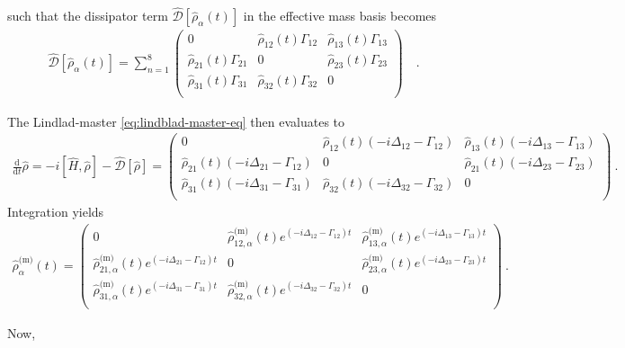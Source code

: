 %
such that the dissipator term $\hat{\mathcal{D}}[\hat{\rho}_\alpha(t)]$ in the effective mass basis becomes
%
    \begin{align} \label{eq:decoherence_operator_eval_with_couplings}
        \hat{\mathcal{D}}[\hat{\rho}_\alpha(t)] 
        =
        \sum_{n=1}^8
        \begin{pmatrix}
            0 & \hat{\rho}_{12}(t) \Gamma_{12} & \hat{\rho}_{13}(t)\Gamma_{13} \\
            \hat{\rho}_{21}(t)\Gamma_{21} & 0 & \hat{\rho}_{23}(t)\Gamma_{23} \\
            \hat{\rho}_{31}(t)\Gamma_{31} & \hat{\rho}_{32}(t)\Gamma_{32} & 0 \\
        \end{pmatrix}
        \quad \text{.}
    \end{align}
%

The Lindlad-master \cref{eq:lindblad-master-eq} then evaluates to
%
\begin{align} \label{eq:lindblad-master-eq_eval}
    \frac{\text{d}}{\text{d}t}{\hat{\rho}} = -i[\hat{H},\hat{\rho}] - \hat{\mathcal{D}}[\hat{\rho}]
    =
    \begin{pmatrix}
        0 & \hat{\rho}_{12}(t)\left(-i\Delta_{12} - \Gamma_{12}\right) & \hat{\rho}_{13}(t)\left(-i\Delta_{13} - \Gamma_{13}\right) \\
        \hat{\rho}_{21}(t)\left(-i\Delta_{21} - \Gamma_{12}\right) & 0 & \hat{\rho}_{21}(t)\left(-i\Delta_{23} - \Gamma_{23}\right) \\
        \hat{\rho}_{31}(t)\left(-i\Delta_{31} - \Gamma_{31}\right) & \hat{\rho}_{32}(t)\left(-i\Delta_{32} - \Gamma_{32}\right) & 0 \\
    \end{pmatrix}      
    \ \text{.}
\end{align}
%
Integration yields
%
\begin{align} \label{eq:rho_of_t}
    \hat{\rho}_\alpha^{\text{(m)}}(t)
    =
    \begin{pmatrix}
        0 & \hat{\rho}_{12,\alpha}^{\text{(m)}}(t)e^{\left(-i\Delta_{12} - \Gamma_{12}\right)t} & \hat{\rho}_{13,\alpha}^{\text{(m)}}(t)e^{\left(-i\Delta_{13} - \Gamma_{13}\right)t} \\
        \hat{\rho}_{21,\alpha}^{\text{(m)}}(t)e^{\left(-i\Delta_{21} - \Gamma_{12}\right)t} & 0 & \hat{\rho}_{23,\alpha}^{\text{(m)}}(t)e^{\left(-i\Delta_{23} - \Gamma_{23}\right)t} \\
        \hat{\rho}_{31,\alpha}^{\text{(m)}}(t)e^{\left(-i\Delta_{31} - \Gamma_{31}\right)t} & \hat{\rho}_{32,\alpha}^{\text{(m)}}(t)e^{\left(-i\Delta_{32} - \Gamma_{32}\right)t} & 0 \\
    \end{pmatrix}      
    \ \text{.}
\end{align}
%

Now, 
